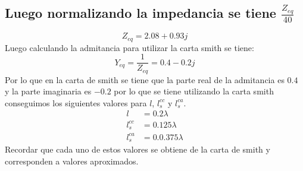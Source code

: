 \documentclass[
  11pt,
  letterpaper,
  answers
]{exam}
\begin{document}
\begin{questions}
\begin{solution}
\begin{parts}
\part{Luego normalizando la impedancia se tiene $\frac{Z_{eq}}{40}$}
\begin{equation}
  Z_{eq} = 2.08 + 0.93j
\end{equation}
Luego calculando la admitancia para utilizar la carta smith se tiene:
\begin{equation}
  Y_{eq} = \frac{1}{Z_{eq}} = 0.4 - 0.2j
\end{equation}
Por lo que en la carta de smith se tiene que la parte real de la admitancia es $0.4$ y la parte imaginaria es $-0.2$ por lo que se tiene utilizando la carta smith conseguimos los siguientes valores para $l$, $l_s^{cc}$ y $l_s^{ca}$.
\begin{align}
  l &= 0.2\lambda\\
  l_s^{cc} &= 0.125\lambda\\
  l_s^{ca} &= 0.0.375\lambda
\end{align}
Recordar que cada uno de estos valores se obtiene de la carta de smith y corresponden a valores aproximados.






\end{parts}
\end{solution}


\end{questions}
\end{document}
